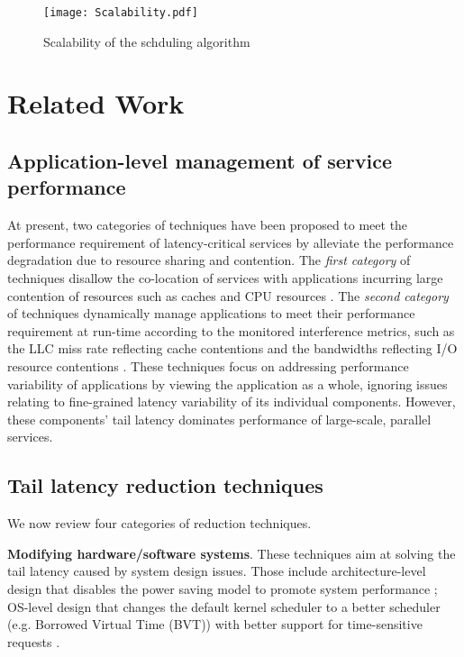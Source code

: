 \documentclass[10pt, conference, compsocconf]{IEEEtran}
\begin{document}
\begin{figure}
\centering
  \texttt{[image: Scalability.pdf]}\\
  \caption{Scalability of the schduling algorithm}
  \label{Fig: Scalability of the searching algorithm}
\end{figure}


\section{Related Work} \label{Section:Related Work}

\subsection{Application-level management of service performance}

At present, two categories of techniques have been proposed to meet the performance requirement of latency-critical services by alleviate the performance degradation due to resource sharing and contention. The \emph{first category} of techniques disallow the co-location of services with applications incurring large contention of resources such as caches \cite{kasture2014ubik} and CPU resources \cite{xu2013bobtail}.
The \emph{second category} of techniques dynamically manage applications to meet their performance requirement at run-time according to the monitored interference metrics, such as the LLC miss rate reflecting cache contentions \cite{ahn2012dynamic} and the bandwidths reflecting I/O resource contentions \cite{xu2010mitigating}.
These techniques focus on addressing performance variability of applications by viewing the application as a whole, ignoring issues relating to fine-grained latency variability of its individual components. However, these components' tail latency dominates performance of large-scale, parallel services.

\subsection{Tail latency reduction techniques}

We now review four categories of reduction techniques.

\textbf{Modifying hardware/software systems}. These techniques aim at solving the tail latency caused by system design issues. Those include architecture-level design that disables the power saving model to promote system performance \cite{wang2013impact}; OS-level design that changes the default kernel scheduler to a better scheduler (e.g. Borrowed Virtual Time (BVT)) with better support for time-sensitive requests \cite{leverich2014reconciling}.
\end{document}
